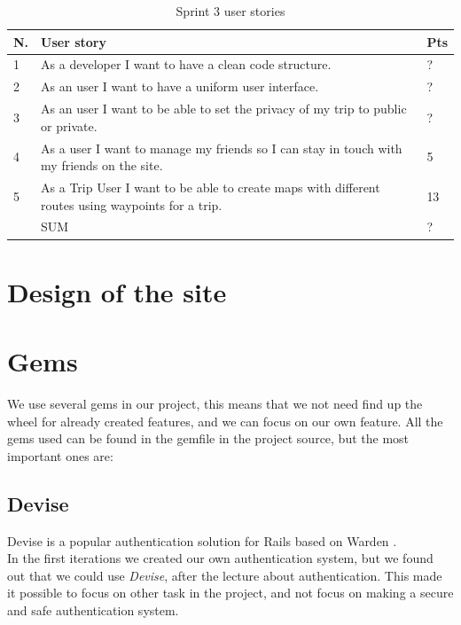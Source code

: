 \documentclass[a4paper]{article}
\begin{document}
\begin{table}
  \centering
  \begin{tabulary}{1.0\linewidth}{|L|L|L|}
    \hline
    N. & User story & Pts \\ & As a developer I want to have a clean code structure.
    & ? \\ \hline

    2& As an user I want to have a uniform user interface.
    & ? \\ \hline

    3& As an user I want to be able to set the privacy of my trip to public or private.
    & ? \\ \hline

    4&As a user I want to manage my friends so I can stay in touch with my friends on the site.
    & 5 \\ \hline

    5& As a Trip User I want to be able to create maps with different routes using waypoints for a trip.
    & 13 \\ \hline

    & SUM & ? \\ \hline
  \end{tabulary}
  \caption{Sprint 3 user stories}
\label{tab:sprint3}
\end{table}

\section{Design of the site}

\section{Gems}
We use several gems in our project, this means that we not need find up the wheel for already created features, and we can focus on our own feature. All the gems used can be found in the gemfile in the project source, but the most important ones are:
\subsection{Devise}
Devise is a popular authentication solution for Rails based on Warden \cite{devise}. \\
In the first iterations we created our own authentication system, but we found out that we could use \textit{Devise}, after the lecture about authentication. This made it possible to focus on other task in the project, and not focus on making a secure and safe authentication system. 
\end{document}
